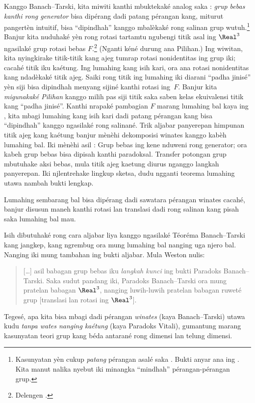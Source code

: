 \documentclass[../../../include/open-logic-section]{subfiles}
\begin{document}
Kanggo Banach--Tarski, kita miwiti kanthi mbuktekaké analog saka
: \emph{grup bebas kanthi rong generator} bisa dipérang
dadi patang pérangan kang, miturut pangertèn intuitif, bisa
``dipindhah'' kanggo mbalèkaké rong salinan grup wutuh.\footnote{
Kasunyatan yèn cukup \emph{patang} pérangan asalé saka
\cite{Robinson1947}. Bukti anyar ana ing
\citet[Téoréma 5.2]{Wagon2016}. Kita manut
\citet[kaca~3]{Weston2003} nalika nyebut iki minangka
``mindhah'' pérangan-pérangan grup.} Banjur kita nuduhaké yèn
rong rotasi tartamtu ngubengi titik asal ing $\Real^3$ ngasilaké
grup rotasi bebas $F$.\footnote{Delengen
\citet[Téoréma 2.1]{Wagon2016}.} (Nganti kéné durung ana Pilihan.)
Ing wiwitan, kita nyingkirake titik-titik kang ajeg tumrap rotasi
nonidentitas ing grup iki; cacahé titik iku kaétung. Ing lumahing
kang isih kari, ora ana rotasi nonidentitas kang ndadèkaké titik ajeg.
Saiki rong titik ing lumahing iki diarani ``padha jinisé'' yèn
siji bisa dipindhah menyang sijiné kanthi rotasi ing~$F$.
Banjur kita \emph{migunakaké Pilihan} kanggo milih pas siji titik
saka saben kelas ekuivalensi titik kang ``padha jinisé''.
Kanthi nrapaké pambagian $F$ marang lumahing bal kaya ing
, kita mbagi lumahing kang isih kari dadi patang
pérangan kang bisa ``dipindhah'' kanggo ngasilaké rong salinané.
Trik aljabar panyerepan himpunan titik ajeg kang kaétung banjur
mènèhi dekomposisi winates kanggo kabèh lumahing bal. Iki mènèhi asil \citep{Hausdorff1914}:
Grup bebas ing kene nduweni rong generator; ora kabeh grup bebas bisa dipisah kanthi paradoksal. Transfer potongan grup mbutuhake aksi bebas, mula titik ajeg kaetung diurus nganggo langkah panyerepan. Iki njlentrehake lingkup sketsa, dudu ngganti teorema lumahing utawa nambah bukti lengkap.

\begin{thm}
Lumahing sembarang bal bisa dipérang dadi sawatara pérangan winates
cacahé, banjur disusun maneh kanthi rotasi lan translasi dadi
rong salinan kang pisah saka lumahing bal mau.
\end{thm}

Isih dibutuhaké rong cara aljabar liya kanggo ngasilaké Téoréma
Banach--Tarski kang jangkep, kang ngrembug ora mung lumahing bal
nanging uga njero bal. Nanging iki mung tambahan ing bukti aljabar.
Mula Weston nulis:
\begin{quote}
  [\ldots] asil babagan grup bebas iku \emph{langkah kunci} ing
  bukti Paradoks Banach--Tarski. Saka sudut pandang iki, Paradoks
  Banach--Tarski ora mung pratelan babagan $\Real^3$, nanging
  luwih-luwih pratelan babagan ruweté grup [translasi lan rotasi
  ing $\Real^3$]. \cite[kaca~16]{Weston2003}
\end{quote}
Tegesé, apa kita bisa mbagi dadi pérangan \emph{winates}
(kaya Banach--Tarski) utawa kudu \emph{tanpa wates nanging kaétung}
(kaya Paradoks Vitali), gumantung marang kasunyatan teori grup
kang béda antarané rong dimensi lan telung dimensi.
\end{document}
